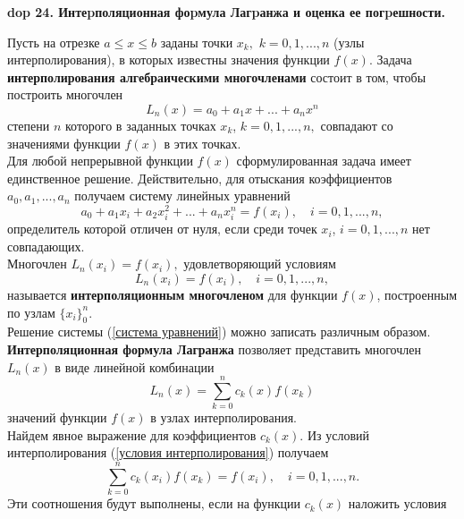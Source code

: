 \textbf{\LARGE dop 24. Интеpполяционная фоpмула Лагpанжа и оценка ее погpешности.}  \\

\renewcommand{\theequation}{\arabic{equation}}
\setcounter{equation}{0}

Пусть на отрезке $a \leq x \leq b$ заданы точки $x_k,$ $k=0,1,...,n$ (узлы интерполирования), в которых известны значения функции $f(x)$. Задача \textbf{интерполирования алгебраическими многочленами} состоит в том, чтобы построить многочлен
\begin{equation*}
    L_n(x)=a_0+a_1x+...+a_nx^n
\end{equation*}
степени $n$ которого в заданных точках $x_k$, $k=0,1,...,n,$ совпадают со значениями функции $f(x)$ в этих точках. \\
Для любой непрерывной функции $f(x)$ сформулированная задача имеет единственное решение. Действительно, для отыскания коэффициентов $a_0, a_1, ...,a_n$ получаем систему линейных уравнений
\begin{equation}
    \label{система уравнений}
    a_0 + a_1x_i+a_2x_i^2+...+a_nx_i^n=f(x_i), \quad i =0,1,...,n,
\end{equation}
определитель которой отличен от нуля, если среди точек $x_i$, $i=0,1,...,n$ нет совпадающих. \\
Многочлен $L_n(x_i)=f(x_i),$ удовлетворяющий условиям
\begin{equation}
    \label{условия интерполирования}
    L_n(x_i)=f(x_i), \quad i =0,1,...,n,
\end{equation}
называется \textbf{интерполяционным многочленом} для функции $f(x)$, построенным по узлам $\{x_i\}_0^n$. \\
Решение системы (\ref{система уравнений}) можно записать различным образом. \textbf{Интерполяционная формула Лагранжа} позволяет представить многочлен $L_n(x)$  в виде линейной комбинации
\begin{equation}
    \label{интерполяционная формула лагранжа}
    L_n(x) = \sum_{k=0}^{n} c_k(x) f(x_k)
\end{equation}
значений функции $f(x)$ в узлах интерполирования. \\
Найдем явное выражение для коэффициентов $c_k(x)$. Из условий интерполирования (\ref{условия интерполирования}) получаем
\begin{equation*}
    \sum_{k=0}^{n} c_k(x_i) f(x_k) = f(x_i), \quad i=0,1,...,n.
\end{equation*}
Эти соотношения будут выполнены, если на функции $c_k(x)$ наложить условия
